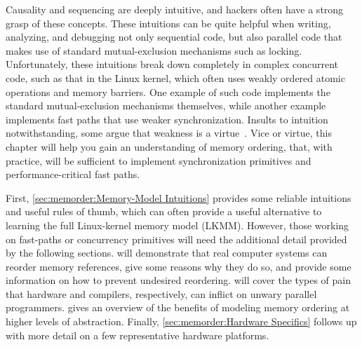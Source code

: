 
%

Causality and sequencing are deeply intuitive, and hackers often
have a strong grasp of these concepts.
These intuitions can be quite helpful when writing, analyzing, and
debugging not only sequential code, but also parallel code that makes
use of standard mutual-exclusion mechanisms such as locking.
Unfortunately, these intuitions break down completely in complex
concurrent code, such as that in the Linux kernel, which often uses
weakly ordered atomic operations and memory barriers.
One example of such code implements the standard mutual-exclusion
mechanisms themselves, while another example implements fast
paths that use weaker synchronization.
Insults to intuition notwithstanding, some argue that weakness is a
virtue~\cite{JadeAlglave2013-WeaknessIsVirtue}.
Vice or virtue, this chapter will help you gain an understanding of
memory ordering, that, with practice, will be sufficient to implement
synchronization primitives and performance-critical fast paths.

First, \cref{sec:memorder:Memory-Model Intuitions}
provides some reliable intuitions and useful rules of thumb, which can
often provide a useful alternative to learning the full Linux-kernel
memory model (LKMM)\@.
However, those working on fast-paths or concurrency primitives will
need the additional detail provided by the following sections.
will demonstrate that real computer systems can reorder memory references,
give some reasons why they do so, and provide some information on how
to prevent undesired reordering.
will cover the types of pain that hardware and compilers, respectively,
can inflict on unwary parallel programmers.
gives an overview of the benefits of modeling memory ordering at
higher levels of abstraction.
Finally,
\cref{sec:memorder:Hardware Specifics}
follows up with more detail on a few representative hardware platforms.

